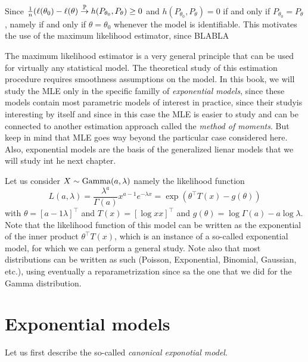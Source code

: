 Since $\frac 1n (\ell(\theta_0) - \ell(\theta) \overset{\mathbb P}{\rightarrow} h(P_{\theta_0}, P_\theta) \geq 0$ and 
$h(P_{\theta_0}, P_\theta) = 0$ if and only if $P_{\theta_0} = P_{\theta}$, namely if and only if $\theta = \theta_0$ whenever the model is identifiable.
This motivates the use of the maximum likelihood estimator, since BLABLA

The maximum likelihood estimator is a very general principle that can be used for virtually any statistical model. 
The theoretical study of this estimation procedure requires smoothness assumptions on the model.
In this book, we will study the MLE only in the specific familly of \emph{exponential models}, since these models contain most parametric models of interest in practice, since their studyis interesting by itself and since in this case the MLE is easier to study and can be connected to another estimation approach called the \emph{method of moments}.
But keep in mind that MLE goes way beyond the particular case considered here.
Also, exponential models are the basis of the generalized lienar models that we will study int he next chapter.

\begin{example}
	Let us consider $X \sim \operatorname{Gamma}(a, \lambda)$ namely the likelihood function
	\begin{equation*}
		L(a, \lambda) = \frac{\lambda^a}{\Gamma(a)} x^{a - 1} e^{-\lambda x} = \exp( \theta^\top T(x) - g(\theta))
	\end{equation*}
	with $\theta = [a - 1 \lambda]^\top$ and $T(x) = [\log x x]^\top$ and $g(\theta) = \log \Gamma(a) - a \log \lambda$.
	Note that the likelihood function of this model can be written as the exponential of the inner product $\theta^\top T(x)$, which is an instance of a so-called exponential model, for which we can perform a general study. Note also that most distributions can be written as such (Poisson, Exponential, Binomial, Gaussian, etc.), using eventually a reparametrization since sa the one that we did for the Gamma distribution.
\end{example}

\section{Exponential models} %
\label{sec:exponential_models}

Let us first describe the so-called \emph{canonical exponotial model}.

